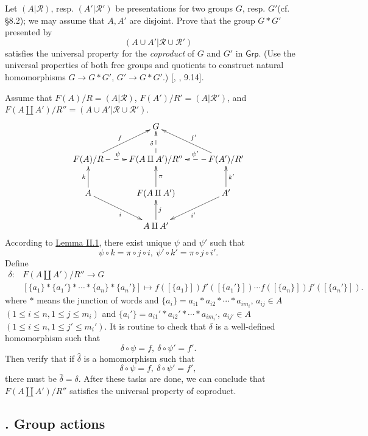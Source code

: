 \documentclass[12pt,letterpaper,boxed]{hmcpset}
\newcommand{\Grp}{\mathsf{Grp}}
\begin{document}
\begin{problem}[8.7]
Let $(A|\mathscr{R})$, resp. $(A'|\mathscr{R}')$ be presentations for two groups $G$, resp. $G'$(cf. §8.2); we may assume that $A, A'$ are disjoint. Prove that the group $G*G'$ presented by
\[
(A\cup A'|\mathscr{R}\cup \mathscr{R}')
\]
satisfies the universal property for the \emph{coproduct} of $G$ and $G'$ in $\Grp$. (Use the universal properties of both free groups and quotients to construct natural homomorphisms $G\to G*G'$, $G'\to G* G'$.) [, , 9.14].
\end{problem}
\begin{solution}
Assume that $F(A)/R=(A|\mathscr{R})$, $F(A')/R'=(A|\mathscr{R}')$, and $F(A\amalg A')/R''=(A\cup A'|\mathscr{R}\cup \mathscr{R}')$.
	\[\xymatrix{
		&G&\\
		F(A)/R\ar[ru]^{f}\ar@{-->}[r]^{\psi\hspace{1em}}&F(A\amalg A')/R''\ar@{-->}[u]^{\delta}&F(A')/R'\ar[lu]_{f'}\ar@{-->}[l]_{\hspace{1em}\psi'}\\
		A\ar[rd]_{i}\ar[u]^{k}&F(A\amalg A')\ar[u]_{\pi}&A'\ar[ld]^{i'}\ar[u]_{k'}\\
		&A\amalg A'\ar[u]_{j} &
	}\]
According to \hyperlink{Lemma II.1}{Lemma II.1}, there exist unique $\psi$ and $\psi'$ such that 
\[
\psi\circ k=\pi\circ j\circ i,\ \psi'\circ k'=\pi\circ j\circ i'.
\]
Define 
\begin{align*}
\delta:&F(A\amalg A')/R''\longrightarrow G\\
&[\{a_1\}*\{a_1'\}*\cdots*\{a_n\}*\{a_n'\}]\longmapsto f([\{a_1\}])f'([\{a_1'\}])\cdots f([\{a_n\}])f'([\{a_n'\}]).
\end{align*}
where $*$ means the junction of words and $\{a_i\}=a_{i1}*a_{i2}*\cdots *a_{im_i}$, $a_{ij}\in A$ $(1\le i\le n,1\le j\le m_i)$ and $\{a_i'\}=a_{i1}'*a_{i2}'*\cdots *a_{im_i'}$, $a_{ij'}\in A$ $(1\le i\le n,1\le j'\le m_i')$.
It is routine to check that $\delta$ is a well-defined homomorphism such that 
$$
\delta\circ\psi=f,\ \delta\circ\psi'=f'.
$$ 
Then verify that if $\hat{\delta}$ is a homomorphism such that 
$$
\delta\circ\psi=f,\ \delta\circ\psi'=f',
$$ 
there must be $\hat{\delta}=\delta$. After these tasks are done, we can conclude that $F(A\amalg A')/R''$ satisfies the universal property of coproduct.

\end{solution}



\subsection{. Group actions}
\end{document}

